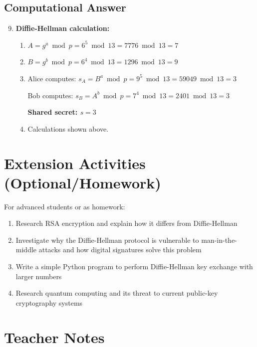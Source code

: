 \documentclass[11pt]{article}
\begin{document}
\subsection*{Computational Answer}

\begin{enumerate}[label=\textbf{\arabic*.}]
    \setcounter{enumi}{8}
    
    \item \textbf{Diffie-Hellman calculation:}
    
    \begin{enumerate}[label=\alph*)]
        \item $A = g^a \bmod p = 6^5 \bmod 13 = 7776 \bmod 13 = 7$
        \item $B = g^b \bmod p = 6^4 \bmod 13 = 1296 \bmod 13 = 9$
        \item Alice computes: $s_A = B^a \bmod p = 9^5 \bmod 13 = 59049 \bmod 13 = 3$
        
        Bob computes: $s_B = A^b \bmod p = 7^4 \bmod 13 = 2401 \bmod 13 = 3$
        
        \textbf{Shared secret: $s = 3$}
        
        \item Calculations shown above.
    \end{enumerate}
\end{enumerate}

\section*{Extension Activities (Optional/Homework)}

For advanced students or as homework:

\begin{enumerate}
    \item Research RSA encryption and explain how it differs from Diffie-Hellman
    \item Investigate why the Diffie-Hellman protocol is vulnerable to man-in-the-middle attacks and how digital signatures solve this problem
    \item Write a simple Python program to perform Diffie-Hellman key exchange with larger numbers
    \item Research quantum computing and its threat to current public-key cryptography systems
\end{enumerate}

\section*{Teacher Notes}
\end{document}
